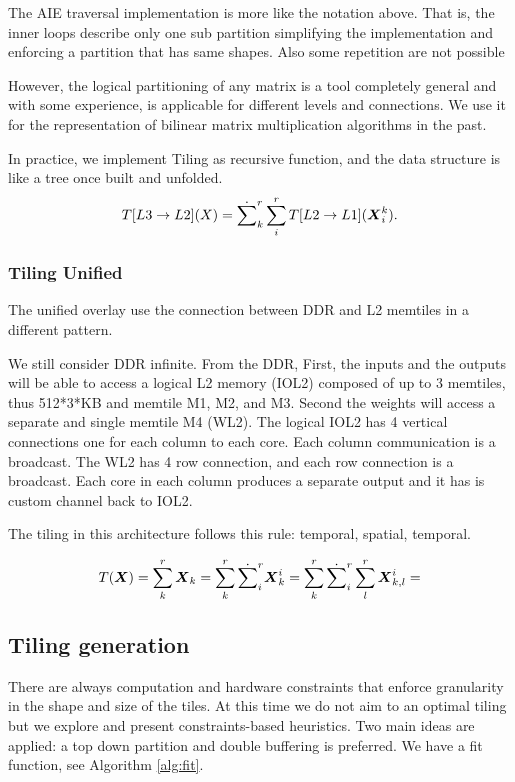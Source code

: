 \documentclass[acmsmall]{acmart}
\begin{document}
The AIE traversal implementation is more like the notation above. That
is, the inner loops describe only one sub partition simplifying the
implementation and enforcing a partition that has same shapes. Also
some repetition are not possible 

However, the logical partitioning of any matrix is a tool completely
general and with some experience, is applicable for different levels
and connections. We use it for the representation of bilinear matrix
multiplication algorithms in the past.

In practice, we implement Tiling as recursive function, and the data
structure is like a tree once built and unfolded.
\begin{equation}
  T[L3\rightarrow L2](X) = \dot\sum_k^r\sum_{i}^rT[L2\rightarrow L1]({\boldsymbol X}^{k}_{i}).
\end{equation}

\subsubsection{Tiling Unified}
The unified overlay use the connection between DDR and L2 memtiles in
a different pattern.

We still consider DDR infinite. From the DDR, First, the inputs and
the outputs will be able to access a logical L2 memory (IOL2) composed
of up to 3 memtiles, thus 512*3*KB and memtile M1, M2, and M3. Second
the weights will access a separate and single memtile M4 (WL2).  The
logical IOL2 has 4 vertical connections one for each column to each
core. Each column communication is a broadcast. The WL2 has 4 row
connection, and each row connection is a broadcast. Each core in each
column produces a separate output and it has is custom channel back to
IOL2.

The tiling in this architecture follows this rule: temporal, spatial,
temporal.

\begin{equation}
T({\boldsymbol X}) = \sum_k^r {\boldsymbol X}_k =
\sum_k^r\dot\sum_{i}^{r}{\boldsymbol X}^i_{k} =
\sum_k^r\dot\sum_{i}^{r}\sum_l^r{\boldsymbol X}_{k,l}^{i} =
\end{equation}



\subsection{Tiling generation}
\label{sec:tiling-generation}
There are always computation and hardware constraints that enforce
granularity in the shape and size of the tiles. At this time we do not
aim to an optimal tiling but we explore and present constraints-based
heuristics. Two main ideas are applied: a top down partition and
double buffering is preferred. We have a fit function, see Algorithm
\ref{alg:fit}.
\end{document}
